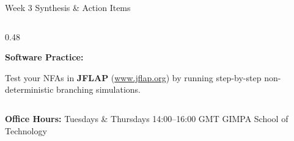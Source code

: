 \documentclass[aspectratio=169, 10pt]{beamer}
\newcommand{\greentitle}[1]{{\noindent\footnotesize\bfseries\color{accentGreen}#1}\par\vspace{0.03cm}}
\begin{document}
\begin{frame}{Week 3 Synthesis \& Action Items}
\begin{columns}[T]
\begin{column}{0.48\textwidth}
\begin{tcolorbox}[examplecard]
        \greentitle{Software Practice:}
        {\scriptsize Test your NFAs in \textbf{JFLAP} (\url{www.jflap.org}) by running step-by-step non-deterministic branching simulations.}
      \end{tcolorbox}
    \end{column}
  \end{columns}
  
  \vspace{0.08cm}
  \begin{tcolorbox}[spotlightcard]
    \centering
    {\scriptsize\textbf{Office Hours:} Tuesdays \& Thursdays 14:00--16:00 GMT \;\textbar\; GIMPA School of Technology}
  \end{tcolorbox}
\end{frame}
\end{document}
